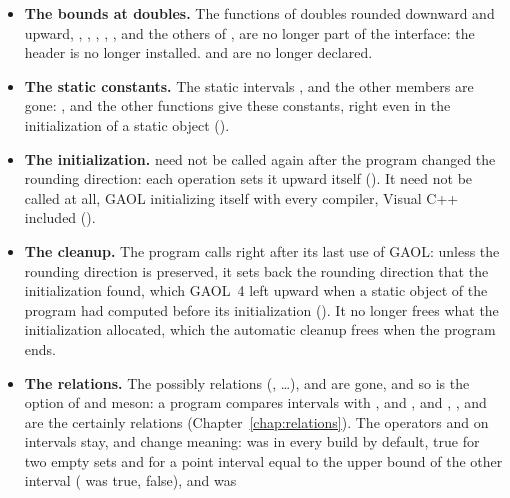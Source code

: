 \begin{itemize}
   in .
\item[$\bullet$] \textbf{The bounds at doubles.} The functions of doubles
  rounded downward and upward, , ,
  , , , 
  and the others of , are no longer part of the
  interface: the header is no longer installed.  and
   are no longer declared.
\item[$\bullet$] \textbf{The static constants.} The static intervals
  ,  and the other 
  members are gone: ,  and the
  other functions give these constants, right even in the initialization of a
  static object ().
\item[$\bullet$] \textbf{The initialization.}  need not be
  called again after the program changed the rounding direction: each
  operation sets it upward itself (). It need
  not be called at all, GAOL initializing itself with every compiler, Visual
  C++ included ().
\item[$\bullet$] \textbf{The cleanup.} The program calls
   right after its last use of GAOL: unless the
  rounding direction is preserved, it sets back the rounding direction that
  the initialization found, which GAOL~4 left upward when a static object of the
  program had computed before its initialization (). It
  no longer frees what the initialization allocated, which the automatic
  cleanup frees when the program ends.
\item[$\bullet$] \textbf{The relations.} The possibly relations
  (, \ldots),
   and  are gone, and so is the
  option  of  and meson: a program
  compares intervals with ,  and
  , and \code{<}, \code{<=}, \code{>} and \code{>=}
  are the certainly relations (Chapter~\ref{chap:relations}). The operators
  \code{==} and \code{!=} on intervals stay, and change meaning: \code{==} was
   in every build by default, true for two empty sets and
  for a point interval equal to the upper bound of the other interval
  (\code{[4] == [3, 4]} was true, \code{[3, 4] == [4]} false), and \code{!=} was

\end{itemize}
